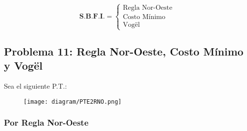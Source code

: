 \documentclass{templateNote}
\begin{document}
\begin{equation*}
    \textbf{S.B.F.I.} = \left\{
        \begin{array}{l} \text{Regla Nor-Oeste} \\
            \text{Costo Mínimo} \\
            \text{Vogël}
        \end{array}
    \right.
\end{equation*}

\subsection*{Problema 11: Regla Nor-Oeste, Costo Mínimo y Vogël}
Sea el siguiente P.T.:
\begin{figure}[H]
    \centering
    \texttt{[image: diagram/PTE2RNO.png]}
\end{figure}

\newpage
\subsubsection*{Por Regla Nor-Oeste}
\end{document}
